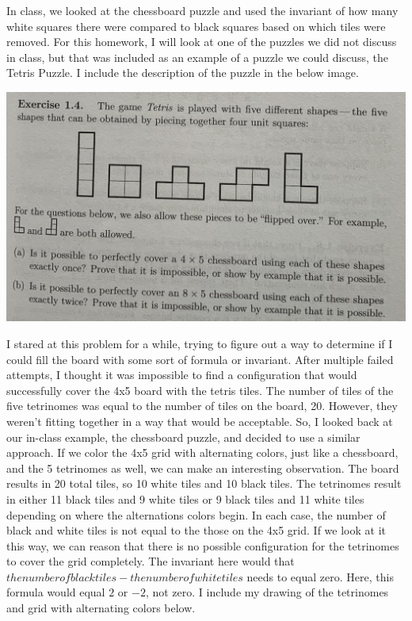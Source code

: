 \documentclass{article}
\theoremstyle{theorem}
\theoremstyle{definition}
\theoremstyle{remark}
\begin{document}
In class, we looked at the chessboard puzzle and used the invariant of how many white squares there were compared to black squares based on which tiles were removed. For this homework, I will look at one of the puzzles we did not discuss in class, but 
that was included as an example of a puzzle we could discuss, the Tetris Puzzle. I include the description of the puzzle in the below image. \\

  \begin{center}
    \includegraphics[width=15cm]{tetrisDesc.jpg}
  \end{center}

I stared at this problem for a while, trying to figure out a way to determine if I could fill the board with some sort of formula or invariant. After multiple failed attempts, I thought it was impossible to find a configuration that would successfully cover the 
4x5 board with the tetris tiles. The number of tiles of the five tetrinomes was equal to the number of tiles on the board, 20. However, they weren't fitting together in a way that would be acceptable. So, I looked back at our in-class example, the chessboard 
puzzle, and decided to use a similar approach. If we color the 4x5 grid with alternating colors, just like a chessboard, and the 5 tetrinomes as well, we can make an interesting observation. The board results in 20 total tiles, so 10 white tiles and 10 black tiles. 
The tetrinomes result in either 11 black tiles and 9 white tiles or 9 black tiles and 11 white tiles depending on where the alternations colors begin. In each case, the number of black and white tiles is not equal to the those on the 4x5 grid. If we look at it this way, 
we can reason that there is no possible configuration for the tetrinomes to cover the grid completely. The invariant here would that $the number of black tiles - the number of white tiles$ needs to equal zero. Here, this formula would equal $2$ or $-2$, not zero. I include 
my drawing of the tetrinomes and grid with alternating colors below. \\
\end{document}

